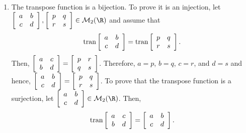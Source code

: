 \begin{enumerate}
\begin{enumerate}
\item The transpose function is a bijection.  To prove it is an injection, let 
$\left[ {\begin{array}{*{20}c}
   a & b  \\
   c & d  \\
\end{array} } \right], \left[ {\begin{array}{*{20}c}
   p & q  \\
   r & s  \\
\end{array} } \right] \in \mathcal{M}_{2}(\R)$ and assume that
\[
\text{tran}\left[ {\begin{array}{*{20}c}
   a & b  \\
   c & d  \\
 \end{array} } \right] = \text{tran}\left[ {\begin{array}{*{20}c}
   p  &  q \\
   r & s  \\
 \end{array} } \right].
\]
Then, $\left[ {\begin{array}{*{20}c}
   a & c  \\
   b & d  \\
\end{array} } \right] = \left[ {\begin{array}{*{20}c}
   p & r  \\
   q & s  \\
\end{array} } \right]$.  Therefore, $a = p$, $b = q$, $c = r$, and $d = s$ and hence, 
$\left[ {\begin{array}{*{20}c}
   a & b  \\
   c & d  \\
\end{array} } \right] = \left[ {\begin{array}{*{20}c}
   p & q  \\
   r & s  \\
\end{array} } \right]$.  To prove that the transpose function is a surjection, let 
$\left[ {\begin{array}{*{20}c}
   a & b  \\
   c & d  \\
\end{array} } \right] \in \mathcal{M}_{2}(\R)$.  Then,
\[
\text{tran}\left[ {\begin{array}{*{20}c}
   a & c  \\
   b & d  \\
 \end{array} } \right] = \left[ {\begin{array}{*{20}c}
   a & b  \\
   c & d  \\
 \end{array} } \right].
\]


\end{enumerate}
\end{enumerate}

